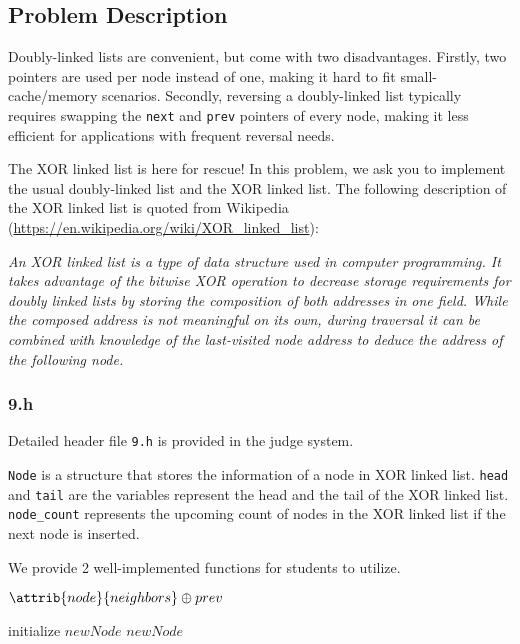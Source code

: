 \setcounter{secnumdepth}{0}

\subsection{Problem Description}\label{problem-description}

Doubly-linked lists are convenient, but come with two disadvantages. Firstly, two pointers are used per node instead of one, making it hard to fit small-cache/memory scenarios. Secondly, reversing a doubly-linked list typically requires swapping the \texttt{next} and \texttt{prev} pointers of every node, making it less efficient for applications with frequent reversal needs.

The XOR linked list is here for rescue! In this problem, we ask you to implement the usual doubly-linked list and the XOR linked list. The following description of the XOR linked list is quoted from Wikipedia (\url{https://en.wikipedia.org/wiki/XOR_linked_list}): 

{\it
An XOR linked list is a type of data structure used in computer programming. It takes advantage of the bitwise XOR operation to decrease storage requirements for doubly linked lists by storing the composition of both addresses in one field. While the composed address is not meaningful on its own, during traversal it can be combined with knowledge of the last-visited node address to deduce the address of the following node.
}

\subsubsection{9.h}\label{9.h}

Detailed header file \texttt{9.h} is provided in the judge system.

\noindent \texttt{Node} is a structure that stores the information of a node in XOR linked list. \texttt{head} and \texttt{tail} are the variables represent the head and the tail of the XOR linked list. \texttt{node\_count} represents the upcoming count of nodes in the XOR linked list if the next node is inserted.

We provide 2 well-implemented functions for students to utilize.

\begin{codebox}
\li \Return $\attrib{node}{neighbors} \oplus prev$
\End
\end{codebox}

\begin{codebox}
\li initialize $newNode$
\li \Return $newNode$
\End
\end{codebox}

